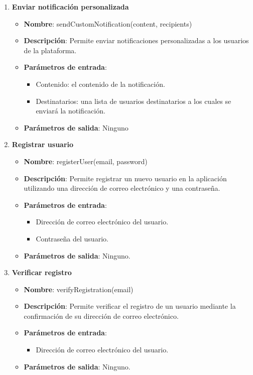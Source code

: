 \begin{enumerate}[label=SOP-\protect\twodigits{\arabic*}:, align=left, leftmargin=*]
\item \textbf{Enviar notificación personalizada}
\begin{itemize}
\item \textbf{Nombre}: sendCustomNotification(content, recipients)
\item \textbf{Descripción}: Permite enviar notificaciones personalizadas a los usuarios de la plataforma.
\item \textbf{Parámetros de entrada}:
\begin{itemize}
\item Contenido: el contenido de la notificación.
\item Destinatarios: una lista de usuarios destinatarios a los cuales se enviará la notificación.
\end{itemize}
\item \textbf{Parámetros de salida}: Ninguno
\end{itemize}

\item \textbf{Registrar usuario}
\begin{itemize}
\item \textbf{Nombre}: registerUser(email, password)
\item \textbf{Descripción}: Permite registrar un nuevo usuario en la aplicación utilizando una dirección de correo electrónico y una contraseña.
\item \textbf{Parámetros de entrada}:
\begin{itemize}
\item Dirección de correo electrónico del usuario.
\item Contraseña del usuario.
\end{itemize}
\item \textbf{Parámetros de salida}: Ninguno.
\end{itemize}

\item \textbf{Verificar registro}
\begin{itemize}
\item \textbf{Nombre}: verifyRegistration(email)
\item \textbf{Descripción}: Permite verificar el registro de un usuario mediante la confirmación de su dirección de correo electrónico.
\item \textbf{Parámetros de entrada}:
\begin{itemize}
\item Dirección de correo electrónico del usuario.
\end{itemize}
\item \textbf{Parámetros de salida}: Ninguno.
\end{itemize}


\end{enumerate}

